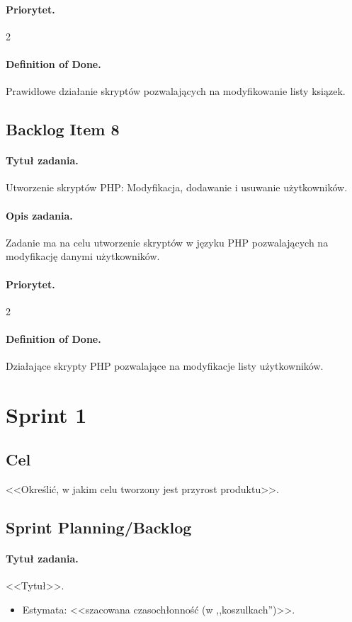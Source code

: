 \documentclass[a4paper]{article}
\begin{document}
\paragraph{Priorytet.} 2
\paragraph{Definition of Done.} Prawidłowe działanie skryptów pozwalających na modyfikowanie listy ksiązek.

\subsection{Backlog Item 8}
\paragraph{Tytuł zadania.} Utworzenie skryptów PHP: Modyfikacja, dodawanie i usuwanie użytkowników.
\paragraph{Opis zadania.} Zadanie ma na celu utworzenie skryptów w języku PHP pozwalających na modyfikację danymi użytkowników.
\paragraph{Priorytet.} 2
\paragraph{Definition of Done.} Działające skrypty PHP pozwalające na modyfikacje listy użytkowników.

\section{Sprint 1}
\subsection{Cel} <<Określić, w jakim celu tworzony jest przyrost produktu>>.
\subsection{Sprint Planning/Backlog}

\paragraph{Tytuł zadania.} <<Tytuł>>.
\begin{itemize}
\item Estymata: <<szacowana czasochłonność (w ,,koszulkach'')>>.
\end{itemize}
\end{document}
